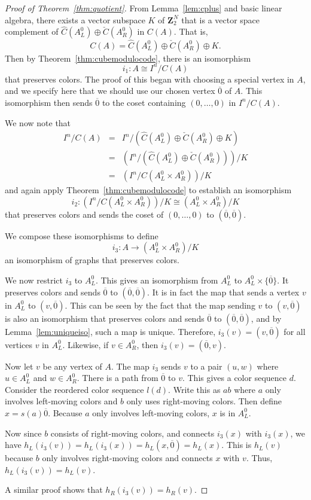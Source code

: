 \documentclass[12pt,twoside,singlespace]{article}
\numberwithin{equation}{section}
\theoremstyle{definition}
\newcommand{\ZZ}{\mathbf{Z}}
\begin{document}
\begin{proof}[Proof of Theorem~\ref{thm:quotient}]
From Lemma~\ref{lem:cplus} and basic linear algebra, there exists a vector subspace $K$ of $\ZZ_2^N$ that is a vector space complement of
$\hat{C}(A_L^0)\oplus \check{C}(A_R^0)$ in $C(A)$.  That is,
\[C(A)=\hat{C}(A_L^0)\oplus \check{C}(A_R^0)\oplus K.\]
Then by Theorem~\ref{thm:cubemodulocode}, there is an isomorphism
\[i_1:A\cong I^n/C(A)\]
that preserves colors.  The proof of this began with choosing a special vertex in $A$, and we specify here that we should use our chosen vertex $\overline{0}$ of $A$.  This isomorphism then sends $\overline{0}$ to the coset containing $(0,\ldots,0)$ in $I^n/C(A)$.

We now note that
\begin{eqnarray*}
I^n/C(A)
&=&I^n/(\hat{C}(A_L^0)\oplus \check{C}(A_R^0)\oplus K)\\
&=&(I^n/(\hat{C}(A_L^0)\oplus \check{C}(A_R^0)))/ K\\
&=&(I^n/C(A_L^0 \times A_R^0))/ K
\end{eqnarray*}
and again apply Theorem~\ref{thm:cubemodulocode} to establish an isomorphism
\[i_2:(I^n/C(A_L^0 \times A_R^0))/ K\cong (A_L^0\times A_R^0)/K\]
that preserves colors and sends the coset of $(0,\ldots,0)$ to $(\overline{0},\overline{0})$.

We compose these isomorphisms to define
\[i_3:A\to (A_L^0\times A_R^0)/K\]
an isomorphism of graphs that preserves colors.



We now restrict $i_3$ to $A_L^0$.  This gives an isomorphism from $A_L^0$ to $A_L^0\times\{\overline{0}\}$.  It preserves colors and sends $\overline{0}$ to $(\overline{0},\overline{0})$.  It is in fact the map that sends a vertex $v$ in $A_L^0$ to $(v,\overline{0})$.  This can be seen by the fact that the map sending $v$ to $(v,\overline{0})$ is also an isomorphism that preserves colors and sends $\overline{0}$ to $(\overline{0},\overline{0})$, and by Lemma~\ref{lem:uniqueiso}, such a map is unique.  Therefore, $i_3(v)=(v,\overline{0})$ for all vertices $v$ in $A_L^0$.  Likewise, if $v\in A_R^0$, then $i_3(v)=(\overline{0},v)$.

Now let $v$ be any vertex of $A$.  The map $i_3$ sends $v$ to a pair $(u,w)$ where $u\in A_L^0$ and $w\in A_R^0$.  There is a path from $\overline{0}$ to $v$.  This gives a color sequence $d$.  Consider the reordered color sequence $l(d)$.  Write this as $ab$ where $a$ only involves left-moving colors and $b$ only uses right-moving colors.  Then define $x=s(a)\overline{0}$.  Because $a$ only involves left-moving colors, $x$ is in $A_L^0$.

Now since $b$ consists of right-moving colors, and connects $i_3(x)$ with $i_3(x)$, we have $h_L(i_3(v))=h_L(i_3(x))=h_L(x,\overline{0})=h_L(x)$.  This is $h_L(v)$ because $b$ only involves right-moving colors and connects $x$ with $v$.  Thus, $h_L(i_3(v))=h_L(v)$.

A similar proof shows that $h_R(i_3(v))=h_R(v)$.
\end{proof}
\end{document}
